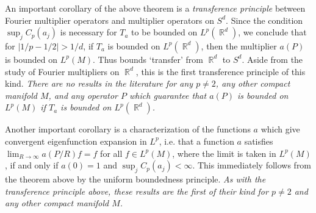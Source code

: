 \documentclass[11pt]{article}
\DeclareMathOperator{\RR}{\mathbb{R}}
\begin{document}
An important corollary of the above theorem is a \emph{transference principle} between Fourier multiplier operators and multiplier operators on $S^d$. Since the condition $\sup_j C_p(a_j)$ is necessary for $T_a$ to be bounded on $L^p(\RR^d)$, we conclude that for $|1/p - 1/2| > 1/d$, if $T_a$ is bounded on $L^p(\RR^d)$, then the multiplier $a(P)$ is bounded on $L^p(M)$. Thus bounds `transfer' from $\RR^d$ to $S^d$. Aside from the study of Fourier multipliers on $\RR^d$, this is the first transference principle of this kind. \emph{There are no results in the literature for any $p \neq 2$, any other compact manifold $M$, and any operator $P$ which guarantee that $a(P)$ is bounded on $L^p(M)$ if $T_a$ is bounded on $L^p(\RR^d)$.}


Another important corollary is a characterization of the functions $a$ which give convergent eigenfunction expansion in $L^p$, i.e. that a function $a$ satisfies $\lim_{R \to \infty} a(P/R) f = f$ for all $f \in L^p(M)$, where the limit is taken in $L^p(M)$, if and only if $a(0) = 1$ and $\sup_j C_p(a_j) < \infty$. This immediately follows from the theorem above by the uniform boundedness principle. \emph{As with the transference principle above, these results are the first of their kind for $p \neq 2$ and any other compact manifold $M$.}
\end{document}
